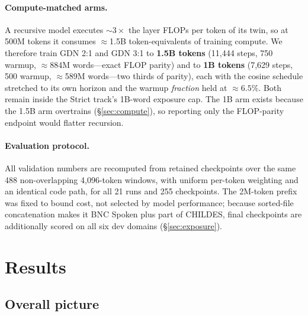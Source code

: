 \documentclass[11pt]{article}
\begin{document}
\paragraph{Compute-matched arms.} A recursive model executes ${\sim}3\times$ the layer FLOPs per token of its twin, so at 500M tokens it consumes $\approx$1.5B token-equivalents of training compute. We therefore train GDN 2:1 and GDN 3:1 to \textbf{1.5B tokens} (11{,}444 steps, 750 warmup, $\approx$884M words---exact FLOP parity) and to \textbf{1B tokens} (7{,}629 steps, 500 warmup, $\approx$589M words---two thirds of parity), each with the cosine schedule stretched to its own horizon and the warmup \emph{fraction} held at ${\approx}6.5\%$. Both remain inside the Strict track's 1B-word exposure cap. The 1B arm exists because the 1.5B arm overtrains (\S\ref{sec:compute}), so reporting only the FLOP-parity endpoint would flatter recursion.

\paragraph{Evaluation protocol.} All validation numbers are recomputed from retained checkpoints over the same 488 non-overlapping 4{,}096-token windows, with uniform per-token weighting and an identical code path, for all 21 runs and 255 checkpoints. The 2M-token prefix was fixed to bound cost, not selected by model performance; because sorted-file concatenation makes it BNC Spoken plus part of CHILDES, final checkpoints are additionally scored on all six dev domains (\S\ref{sec:exposure}).

\section{Results}

\subsection{Overall picture}
\end{document}

